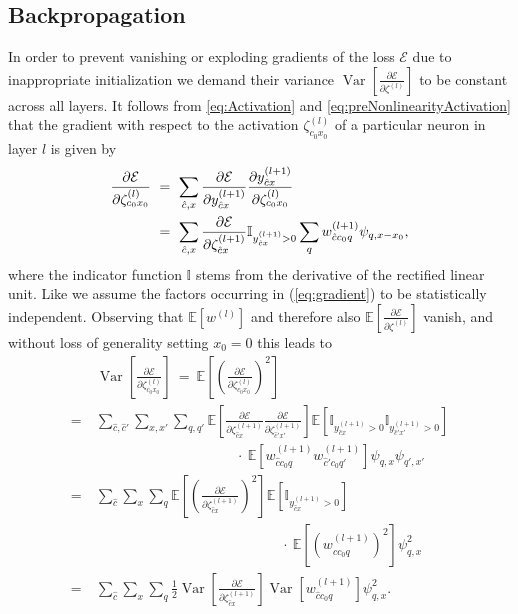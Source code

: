 \documentclass[10pt,twocolumn,letterpaper]{article}
\newcommand{\E}{\mathbb{E}}
\newcommand{\Var}{\operatorname{Var}}
\begin{document}
\subsection{Backpropagation}
In order to prevent vanishing or exploding gradients of the loss $\mathcal{E}$ due to inappropriate initialization we demand their variance $\Var\left[\frac{\partial\mathcal{E}}{\partial\zeta^{(l)}}\right]$ to be constant across all layers.
It follows from \eqref{eq:Activation} and \eqref{eq:preNonlinearityActivation} that the gradient with respect to the activation $\zeta_{c_0 x_0}^{(l)}$ of a particular neuron in layer $l$ is given by
\begin{align}\label{eq:gradient}
	\frac{\partial\mathcal{E}}{\partial\zeta_{c_0x_0}^{(l)}}
	\ &=\ \sum\limits_{\hat{c},x} \frac{\partial\mathcal{E}}{\partial y_{\hat{c}x}^{(l+1)}} \frac{\partial y_{\hat{c}x}^{(l+1)}}{\partial\zeta_{c_0x_0}^{(l)}} \\\notag
	\ &=\ \sum\limits_{\hat{c},x} \frac{\partial\mathcal{E}}{\partial \zeta_{\hat{c}x}^{(l+1)}}\mathbb{I}_{y_{\hat{c}x}^{(l+1)}>0} \sum\limits_q w_{\hat{c}c_0q}^{(l+1)}\psi_{q,x-x_0},
\end{align}
where the indicator function $\mathbb{I}$ stems from the derivative of the rectified linear unit. Like \citet{DBLP:journals/corr/HeZR015} we assume the factors occurring in (\ref{eq:gradient}) to be statistically independent. Observing that $\E\left[w^{(l)}\right]$ and therefore also $\E\left[\frac{\partial\mathcal{E}}{\partial\zeta^{(l)}}\right]$ vanish, and without loss of generality setting $x_0=0$ this leads to
\allowdisplaybreaks
\begin{align*}
	&\ \Var\left[\frac{\partial\mathcal{E}}{\partial\zeta_{c_0x_0}^{(l)}}\right]
	\ =\ \E\left[\left(\frac{\partial\mathcal{E}}{\partial\zeta_{c_0x_0}^{(l)}}\right)^2\right]\\
	=&\  \sum\limits_{\hat{c},\hat{c}'}\sum\limits_{x,x'}\sum\limits_{q,q'}\E\left[\frac{\partial\mathcal{E}}{\partial\zeta_{\hat{c}x}^{(l+1)}}\frac{\partial\mathcal{E}}{\partial\zeta_{\hat{c}'x'}^{(l+1)}}\right] \E\left[\mathbb{I}_{y_{\hat{c}x}^{(l+1)}>0}\mathbb{I}_{y_{\hat{c}'x'}^{(l+1)}>0}\right] \\
	&\qquad\qquad\qquad\qquad\qquad\ \cdot\ \E\left[w_{\hat{c}c_0q}^{(l+1)}w_{\hat{c}'c_0q'}^{(l+1)}\right]\psi_{q,x}\psi_{q',x'}\\
	=&\  \sum\limits_{\hat{c}}\sum\limits_{x}\sum\limits_{q}\E\left[\left(\frac{\partial\mathcal{E}}{\partial\zeta_{\hat{c}x}^{(l+1)}}\right)^2\right]\E\left[\mathbb{I}_{y_{\hat{c}x}^{(l+1)}>0}\right]\\
	&\qquad\qquad\qquad\qquad\qquad\qquad\quad\ \ \cdot\ \E\left[\left(w_{\hat{c}c_0q}^{(l+1)}\right)^2\right]\psi_{q,x}^2\\
	=&\ \sum\limits_{\hat{c}}\sum\limits_{x}\sum\limits_{q}\frac{1}{2}\Var\left[\frac{\partial\mathcal{E}}{\partial\zeta_{\hat{c}x}^{(l+1)}}\right]\Var\left[w_{\hat{c}c_0q}^{(l+1)}\right]\psi_{q,x}^2.
\end{align*}
\end{document}
